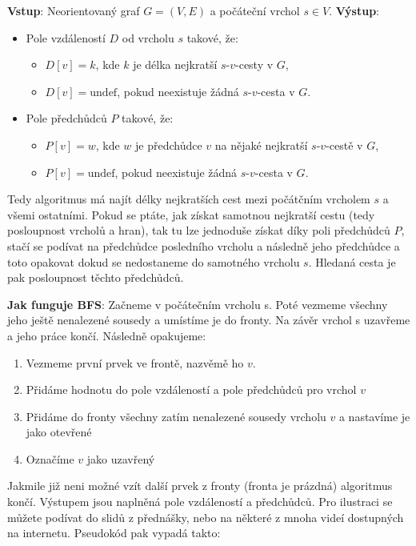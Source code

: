 \noindent \textbf{Vstup}: Neorientovaný graf $G = (V, E)$ a počáteční vrchol $s \in V$. \newline
\noindent \textbf{Výstup}:
\begin{itemize}[itemsep=-0.2em, topsep=0.1em]
    \item Pole vzdáleností $D$ od vrcholu $s$ takové, že:
    \begin{itemize}[itemsep=-0.15em, label=$\bullet$]
        \item $D[v] = k$, kde $k$ je délka nejkratší $s$-$v$-cesty v $G$,
        \item $D[v] = \text{undef}$, pokud neexistuje žádná $s$-$v$-cesta v $G$.
    \end{itemize}
    \item Pole předchůdců $P$ takové, že:
    \begin{itemize}[itemsep=-0.15em, label=$\bullet$]
        \item $P[v] = w$, kde $w$ je předchůdce $v$ na nějaké nejkratší $s$-$v$-cestě v $G$,
        \item $P[v] = \text{undef}$, pokud neexistuje žádná $s$-$v$-cesta v $G$.
    \end{itemize}
\end{itemize}

\medskip

\noindent Tedy algoritmus má najít délky nejkratších cest mezi počátčním vrcholem $s$ a všemi ostatními. Pokud se ptáte, jak získat samotnou nejkratší cestu (tedy posloupnost vrcholů a hran), tak tu lze jednoduše získat díky poli předchůdců $P$, stačí se podívat na předchůdce posledního vrcholu a následně jeho předchůdce a toto opakovat dokud se nedostaneme do samotného vrcholu $s$. Hledaná cesta je pak posloupnost těchto předchůdců.

\bigskip

\noindent \textbf{Jak funguje BFS}: Začneme v počátečním vrcholu s. Poté vezmeme všechny jeho ještě nenalezené sousedy a umístíme je do fronty. Na závěr vrchol s uzavřeme a jeho práce končí. Následně opakujeme:
\begin{enumerate}
    \item Vezmeme první prvek ve frontě, nazvěmě ho $v$.
    \item Přidáme hodnotu do pole vzdáleností a pole předchůdců pro vrchol $v$
    \item Přidáme do fronty všechny zatím nenalezené sousedy vrcholu $v$ a nastavíme je jako otevřené
    \item Označíme $v$ jako uzavřený
\end{enumerate}
Jakmile již neni možné vzít další prvek z fronty (fronta je prázdná) algoritmus končí. Výstupem jsou naplněná pole vzdáleností a předchůdců. Pro ilustraci se můžete podívat do slidů z přednášky, nebo na některé z mnoha videí dostupných na internetu. Pseudokód pak vypadá takto: 

